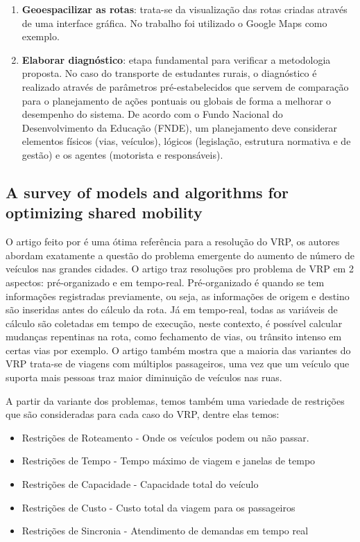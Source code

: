 \begin{enumerate}
    \item \textbf{Geoespacilizar as rotas}: trata-se da visualização das rotas criadas através de uma interface gráfica. No trabalho foi utilizado o Google Maps como exemplo.
    
    \item \textbf{Elaborar diagnóstico}: etapa fundamental para verificar a metodologia proposta. No caso do transporte de estudantes rurais, o diagnóstico é realizado através de parâmetros pré-estabelecidos que servem de comparação para o planejamento de ações pontuais ou globais de forma a melhorar o desempenho do sistema. De acordo com o Fundo Nacional do Desenvolvimento da Educação (FNDE), um planejamento deve considerar elementos físicos (vias, veículos), lógicos (legislação, estrutura normativa e de gestão) e os agentes (motorista e responsáveis). 
\end{enumerate}


\subsection{A survey of models and algorithms for optimizing shared mobility}

O artigo feito por \cite{MOURAD2019323} é uma ótima referência para a resolução do VRP, os autores abordam exatamente a questão do problema emergente do aumento de número de veículos nas grandes cidades. O artigo traz resoluções pro problema de VRP em 2 aspectos: pré-organizado e em tempo-real. Pré-organizado é quando se tem informações  registradas previamente, ou seja, as informações de origem e destino são inseridas antes do cálculo da rota. Já em tempo-real, todas as variáveis de cálculo são coletadas em tempo de execução, neste contexto, é possível calcular mudanças repentinas na rota, como fechamento de vias, ou trânsito intenso em certas vias por exemplo. O artigo também mostra que a maioria das variantes do VRP trata-se de viagens com múltiplos passageiros, uma vez que um veículo que suporta mais pessoas traz maior diminuição de veículos nas ruas.

A partir da variante dos problemas, temos também uma variedade de restrições que são consideradas para cada caso do VRP, dentre elas temos:
\begin{itemize}
\item Restrições de Roteamento - Onde os veículos podem ou não passar.
\item Restrições de Tempo - Tempo máximo de viagem e janelas de tempo
\item Restrições de Capacidade - Capacidade total do veículo
\item Restrições de Custo - Custo total da viagem para os passageiros
\item Restrições de Sincronia - Atendimento de demandas em tempo real
\end{itemize}

